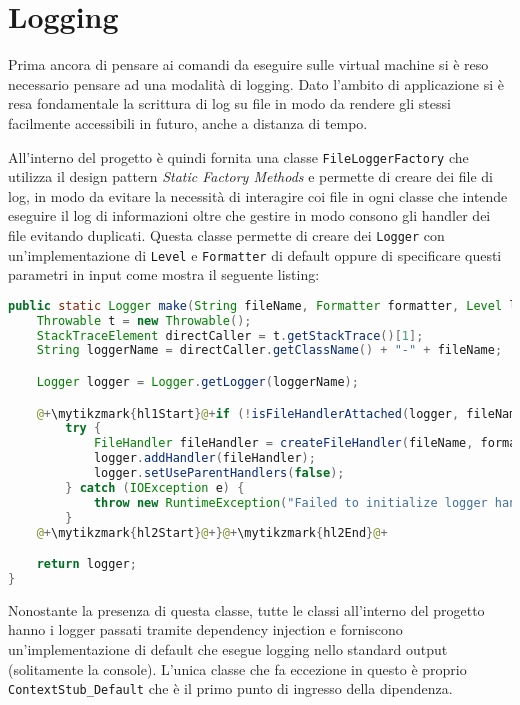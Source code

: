 \section{Logging}
Prima ancora di pensare ai comandi da eseguire sulle virtual machine si è reso necessario pensare ad una modalità di logging. Dato l'ambito di applicazione si è resa fondamentale la scrittura di log su file in modo da rendere gli stessi facilmente accessibili in futuro, anche a distanza di tempo.\par
All'interno del progetto è quindi fornita una classe \texttt{FileLoggerFactory} che utilizza il design pattern \emph{Static Factory Methods} \cite{effectiveJava} e permette di creare dei file di log, in modo da evitare la necessità di interagire coi file in ogni classe che intende eseguire il log di informazioni oltre che gestire in modo consono gli handler dei file evitando duplicati. Questa classe permette di creare dei \texttt{Logger} con un'implementazione di \texttt{Level} e \texttt{Formatter} di default oppure di specificare questi parametri in input come mostra il seguente listing:
\begin{lstlisting}[language=Java, caption={Metodo make di FileLoggerFactory}, label=code:FileLoggerFactoryMake]
public static Logger make(String fileName, Formatter formatter, Level level) {
    Throwable t = new Throwable();
    StackTraceElement directCaller = t.getStackTrace()[1];
    String loggerName = directCaller.getClassName() + "-" + fileName;

    Logger logger = Logger.getLogger(loggerName);

    @+\mytikzmark{hl1Start}@+if (!isFileHandlerAttached(logger, fileName)) {@+\mytikzmark{hl1End}@+
        try {
            FileHandler fileHandler = createFileHandler(fileName, formatter, level);
            logger.addHandler(fileHandler);
            logger.setUseParentHandlers(false);
        } catch (IOException e) {
            throw new RuntimeException("Failed to initialize logger handler.", e);
        }
    @+\mytikzmark{hl2Start}@+}@+\mytikzmark{hl2End}@+

    return logger;
}
    \end{lstlisting}
Nonostante la presenza di questa classe, tutte le classi all'interno del progetto hanno i logger passati tramite dependency injection e forniscono un'implementazione di default che esegue logging nello standard output (solitamente la console). L'unica classe che fa eccezione in questo è proprio \texttt{ContextStub\_Default} che è il primo punto di ingresso della dipendenza.\par
